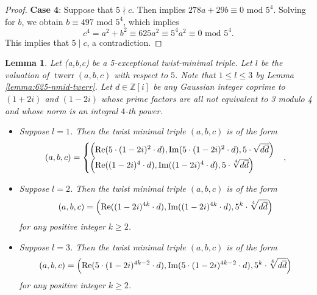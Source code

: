 \documentclass[12pt]{amsart}
\newcounter{counter}[section] %
\numberwithin{equation}{section} %
\newtheorem{lemma}[counter]{Lemma}
\theoremstyle{definition} \newtheorem{definition}[counter]{Definition}
\theoremstyle{remark} \newtheorem{nonexam}[counter]{Non-example}
\newcommand{\md}{\text{ mod }} %
\renewcommand{\Re}{\mathrm{Re}} %
\renewcommand{\Im}{\mathrm{Im}} %
\let\originalleft\left \let\originalright\right
\renewcommand{\left}{\mathopen{}\mathclose\bgroup\originalleft}
\renewcommand{\right}{\aftergroup\egroup\originalright}
\DeclareMathOperator{\twerr}{twerr} %
\begin{document}
\begin{proof}
    \medskip \textbf{Case 4}: Suppose that $5 \nmid c$. Then 
    implies $278a + 29b \equiv 0 \text{ mod } 5^4$. Solving for $b$, we obtain
    $b \equiv 497 \md 5^4$, which implies
    \begin{equation*}
       c^4 = a^2 + b^2 \equiv 625 a^2 \equiv 5^4 a^2 \equiv 0 \md5^4.
    \end{equation*}
    This implies that $5 \mid c$, a contradiction.
\end{proof}

\begin{lemma}
    Let (a,b,c) be a 5-exceptional twist-minimal triple. Let $l$ be the valuation of $\twerr(a,b,c)$ with respect to $5$. Note that $1 \leq l \leq 3$ by Lemma \ref{lemma:625-nmid-twerr}. Let $d \in \mathbb{Z}[i]$ be any Gaussian integer coprime to $(1+2i)$ and $(1-2i)$ whose prime factors are all not equivalent to 3 modulo 4 and whose norm is an integral $4$-th power. 
    \begin{itemize}
        \item Suppose $l = 1$. Then the twist minimal triple $(a,b,c)$ is of the form
        \begin{equation}
            (a,b,c) = \begin{cases} \left(\Re(5 \cdot (1-2i)^2 \cdot d), \Im(5 \cdot (1-2i)^2 \cdot d), 5 \cdot \sqrt{d \overline{d}} \right) \\
            \left(\Re((1-2i)^4 \cdot d), \Im((1-2i)^4 \cdot d), 5 \cdot \sqrt[4]{d \overline{d}} \right)
            \end{cases},
        \end{equation}
        \item Suppose $l = 2$. Then the twist minimal triple $(a,b,c)$ is of the form
        \begin{equation}
            (a,b,c) = \left(\Re((1-2i)^{4k} \cdot d), \Im((1-2i)^{4k} \cdot d), 5^k \cdot \sqrt[4]{d \overline{d}} \right)
        \end{equation}
        for any positive integer $k \geq 2$.
        \item Suppose $l = 3$. Then the twist minimal triple $(a,b,c)$ is of the form
        \begin{equation}
            (a,b,c) = \left(\Re(5 \cdot (1-2i)^{4k-2} \cdot d), \Im(5 \cdot (1-2i)^{4k-2} \cdot d), 5^k \cdot \sqrt[4]{d \overline{d}} \right)
        \end{equation}
        for any positive integer $k \geq 2$.
    \end{itemize}
\end{lemma}
\end{document}
